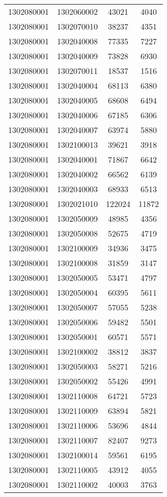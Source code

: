 \begin{longtable}{llcc}
1302080001 & 1302060002 & 43021 & 4040\\
1302080001 & 1302070010 & 38237 & 4351\\
1302080001 & 1302040008 & 77335 & 7227\\
1302080001 & 1302040009 & 73828 & 6930\\
1302080001 & 1302070011 & 18537 & 1516\\
1302080001 & 1302040004 & 68113 & 6380\\
1302080001 & 1302040005 & 68608 & 6494\\
1302080001 & 1302040006 & 67185 & 6306\\
1302080001 & 1302040007 & 63974 & 5880\\
1302080001 & 1302100013 & 39621 & 3918\\
1302080001 & 1302040001 & 71867 & 6642\\
1302080001 & 1302040002 & 66562 & 6139\\
1302080001 & 1302040003 & 68933 & 6513\\
1302080001 & 1302021010 & 122024 & 11872\\
1302080001 & 1302050009 & 48985 & 4356\\
1302080001 & 1302050008 & 52675 & 4719\\
1302080001 & 1302100009 & 34936 & 3475\\
1302080001 & 1302100008 & 31859 & 3147\\
1302080001 & 1302050005 & 53471 & 4797\\
1302080001 & 1302050004 & 60395 & 5611\\
1302080001 & 1302050007 & 57055 & 5238\\
1302080001 & 1302050006 & 59482 & 5501\\
1302080001 & 1302050001 & 60571 & 5571\\
1302080001 & 1302100002 & 38812 & 3837\\
1302080001 & 1302050003 & 58271 & 5216\\
1302080001 & 1302050002 & 55426 & 4991\\
1302080001 & 1302110008 & 64721 & 5723\\
1302080001 & 1302110009 & 63894 & 5821\\
1302080001 & 1302110006 & 53696 & 4844\\
1302080001 & 1302110007 & 82407 & 9273\\
1302080001 & 1302100014 & 59561 & 6195\\
1302080001 & 1302110005 & 43912 & 4055\\
1302080001 & 1302110002 & 40003 & 3763\\

\end{longtable}
